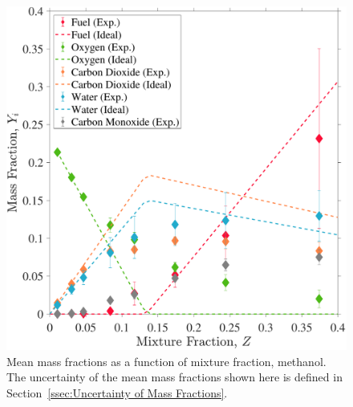 \documentclass[12pt]{article}
\begin{document}
\begin{figure}[!]
	\centering
\includegraphics[width=\textwidth,keepaspectratio]{Adjusted_FuelMethanol_Mixture_Fraction_Intermediate_Plot.pdf}
	\caption[Mean mass fractions as a function of mixture fraction, methanol]{Mean mass fractions as a function of mixture fraction, methanol. The uncertainty of the mean mass fractions shown here is defined in Section~\ref{ssec:Uncertainty of Mass Fractions}.}
	\label{fig:Methanol_Mix_Frac}
\end{figure}
\end{document}
